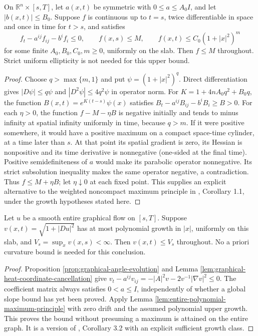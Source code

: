 \begin{lemma}\label{lem:entire-polynomial-maximum-principle}
On $\mathbb R^n\times[s,T]$, let $a(x,t)$ be symmetric with $0\leq a\leq A_0 I$, and let $|b(x,t)|\leq B_0$. Suppose $f$ is continuous up to $t=s$, twice differentiable in space and once in time for $t>s$, and satisfies
\[
 f_t-a^{ij}f_{ij}-b^if_i\leq0,\qquad
 f(x,s)\leq M,
 \qquad f(x,t)\leq C_0(1+|x|^2)^m
\]
for some finite $A_0,B_0,C_0,m\geq0$, uniformly on the slab. Then $f\leq M$ throughout. Strict uniform ellipticity is not needed for this upper bound.
\end{lemma}
\begin{proof}
Choose $q>\max\{m,1\}$ and put $\psi=(1+|x|^2)^q$. Direct differentiation gives
$|D\psi|\leq q\psi$ and $|D^2\psi|\leq4q^2\psi$ in operator norm. For $K=1+4nA_0q^2+B_0q$, the function $B(x,t)=e^{K(t-s)}\psi(x)$ satisfies
$B_t-a^{ij}B_{ij}-b^iB_i\geq B>0$.
For each $\eta>0$, the function $f-M-\eta B$ is negative initially and tends to minus infinity at spatial infinity uniformly in time, because $q>m$. If it were positive somewhere, it would have a positive maximum on a compact space-time cylinder, at a time later than $s$. At that point its spatial gradient is zero, its Hessian is nonpositive and its time derivative is nonnegative (one-sided at the final time). Positive semidefiniteness of $a$ would make its parabolic operator nonnegative. Its strict subsolution inequality makes the same operator negative, a contradiction. Thus $f\leq M+\eta B$; let $\eta\downarrow0$ at each fixed point. This supplies an explicit alternative to the weighted noncompact maximum principle in \cite{EH89}, Corollary 1.1, under the growth hypotheses stated here.
\end{proof}

\begin{proposition}\label{prop:entire-graph-slope-preservation}
Let $u$ be a smooth entire graphical flow on $[s,T]$. Suppose $v(x,t)=\sqrt{1+|Du|^2}$ has at most polynomial growth in $|x|$, uniformly on this slab, and $V_s=\sup_xv(x,s)<\infty$. Then $v(x,t)\leq V_s$ throughout. No a priori curvature bound is needed for this conclusion.
\end{proposition}
\begin{proof}
Proposition \ref{prop:graphical-angle-evolution} and Lemma \ref{lem:graphical-heat-coordinate-cancellation} give
$v_t-a^{ij}v_{ij}=-|A|^2v-2v^{-1}|\nabla v|^2\leq0$.
The coefficient matrix always satisfies $0<a\leq I$, independently of whether a global slope bound has yet been proved. Apply Lemma \ref{lem:entire-polynomial-maximum-principle} with zero drift and the assumed polynomial upper growth. This proves the bound without presuming a maximum is attained on the entire graph. It is a version of \cite{EH89}, Corollary 3.2 with an explicit sufficient growth class.
\end{proof}


